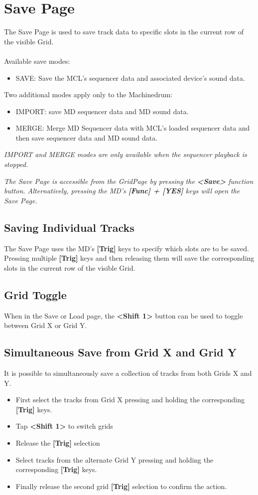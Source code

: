 \chapter{Save Page}

The Save Page is used to save track data to specific slots in the current row of the visible  Grid.\\
\\
Available save modes:
\begin{itemize}
    \item SAVE: Save the MCL's sequencer data and associated device's sound data.
\end{itemize}
Two additional modes apply only to the Machinedrum:
\begin{itemize}
    \item IMPORT: save MD sequencer data and MD sound data. 
    \item MERGE: Merge MD Sequencer data with MCL's loaded sequencer data and then save sequencer data and MD sound data.
\end{itemize}
\textit{IMPORT and MERGE modes are only available when the sequencer playback is stopped.}
\\



\textit{The Save Page is accessible from the GridPage by pressing the \textbf{<Save>} function button. Alternatively, pressing the MD's \textbf{[Func] + [YES]} keys will open the Save Page.}

\newpage
\section{Saving Individual Tracks}
The Save Page uses the MD's \textbf{[Trig]} keys to specify which slots are to be saved. Pressing multiple \textbf{[Trig]} keys and then releasing them will save the corresponding slots in the current row of the visible Grid.
\section{Grid Toggle}
When in the Save or Load page, the \textbf{<Shift 1>} button can be used to toggle between Grid X or Grid Y.
\section{Simultaneous Save from Grid X and Grid Y}
It is possible to simultaneously save a collection of tracks from both Grids X and Y. 
\begin{itemize}
\item First select the tracks from Grid X pressing and holding the corresponding \textbf{[Trig]} keys.
\item Tap \textbf{<Shift 1>} to switch grids
\item Release the \textbf{[Trig]} selection
\item Select tracks from the alternate Grid Y pressing and holding the corresponding \textbf{[Trig]} keys. 
\item Finally release the second grid \textbf{[Trig]} selection to confirm the action. 
\end{itemize}

